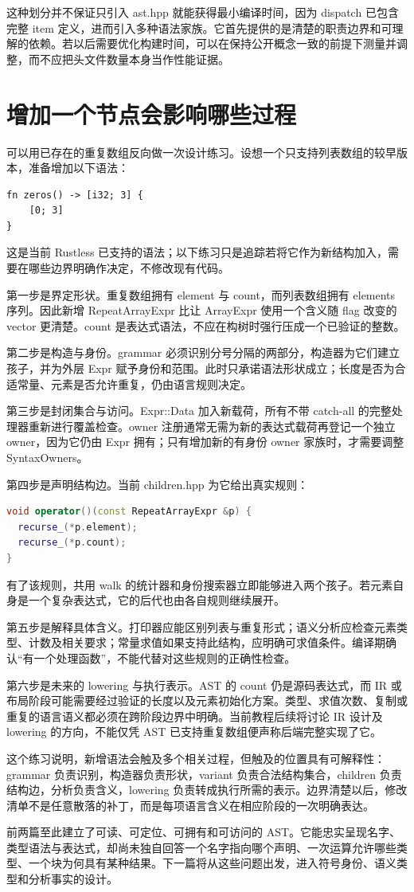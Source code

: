 这种划分并不保证只引入 ast.hpp 就能获得最小编译时间，因为 dispatch 已包含完整 item 定义，进而引入多种语法家族。它首先提供的是清楚的职责边界和可理解的依赖。若以后需要优化构建时间，可以在保持公开概念一致的前提下测量并调整，而不应把头文件数量本身当作性能证据。

\section{增加一个节点会影响哪些过程}
可以用已存在的重复数组反向做一次设计练习。设想一个只支持列表数组的较早版本，准备增加以下语法：
\begin{lstlisting}[language=Rustless]
fn zeros() -> [i32; 3] {
    [0; 3]
}
\end{lstlisting}
这是当前 Rustless 已支持的语法；以下练习只是追踪若将它作为新结构加入，需要在哪些边界明确作决定，不修改现有代码。

第一步是界定形状。重复数组拥有 element 与 count，而列表数组拥有 elements 序列。因此新增 RepeatArrayExpr 比让 ArrayExpr 使用一个含义随 flag 改变的 vector 更清楚。count 是表达式语法，不应在构树时强行压成一个已验证的整数。

第二步是构造与身份。grammar 必须识别分号分隔的两部分，构造器为它们建立孩子，并为外层 Expr 赋予身份和范围。此时只承诺语法形状成立；长度是否为合适常量、元素是否允许重复，仍由语言规则决定。

第三步是封闭集合与访问。Expr::Data 加入新载荷，所有不带 catch-all 的完整处理器重新进行覆盖检查。owner 注册通常无需为新的表达式载荷再登记一个独立 owner，因为它仍由 Expr 拥有；只有增加新的有身份 owner 家族时，才需要调整 SyntaxOwners。

第四步是声明结构边。当前 children.hpp 为它给出真实规则：
\begin{lstlisting}[language=C++]
void operator()(const RepeatArrayExpr &p) {
  recurse_(*p.element);
  recurse_(*p.count);
}
\end{lstlisting}
有了该规则，共用 walk 的统计器和身份搜索器立即能够进入两个孩子。若元素自身是一个复杂表达式，它的后代也由各自规则继续展开。

第五步是解释具体含义。打印器应能区别列表与重复形式；语义分析应检查元素类型、计数及相关要求；常量求值如果支持此结构，应明确可求值条件。编译期确认“有一个处理函数”，不能代替对这些规则的正确性检查。

第六步是未来的 lowering 与执行表示。AST 的 count 仍是源码表达式，而 IR 或布局阶段可能需要经过验证的长度以及元素初始化方案。类型、求值次数、复制或重复的语言语义都必须在跨阶段边界中明确。当前教程后续将讨论 IR 设计及 lowering 的方向，不能仅凭 AST 已支持重复数组便声称后端完整实现了它。

这个练习说明，新增语法会触及多个相关过程，但触及的位置具有可解释性：grammar 负责识别，构造器负责形状，variant 负责合法结构集合，children 负责结构边，分析负责含义，lowering 负责转成执行所需的表示。边界清楚以后，修改清单不是任意散落的补丁，而是每项语言含义在相应阶段的一次明确表达。

前两篇至此建立了可读、可定位、可拥有和可访问的 AST。它能忠实呈现名字、类型语法与表达式，却尚未独自回答一个名字指向哪个声明、一次运算允许哪些类型、一个块为何具有某种结果。下一篇将从这些问题出发，进入符号身份、语义类型和分析事实的设计。
